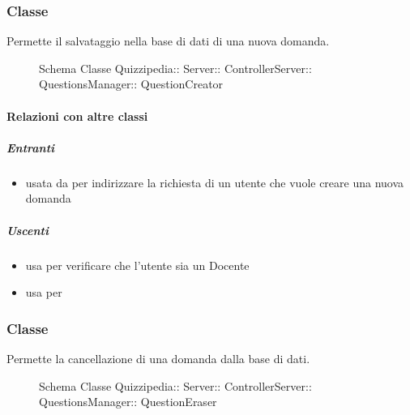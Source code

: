 \subsubsection{Classe }
Permette il salvataggio nella base di dati di una nuova domanda.
\begin{figure}[H]
\centering
\noindent{}
\caption[Schema Classe QuestionCreator]{Schema Classe Quizzipedia:: Server:: ControllerServer:: QuestionsManager:: QuestionCreator}
\end{figure}
\paragraph{Relazioni con altre classi}
\subparagraph{Entranti}
\begin{itemize}
\item usata da  per indirizzare la richiesta di un utente che vuole creare una nuova domanda
\end{itemize}
\subparagraph{Uscenti}
\begin{itemize}
\item usa  per verificare che l'utente sia un Docente
\item usa  per 
\end{itemize}
\subsubsection{Classe }
Permette la cancellazione di una domanda dalla base di dati.
\begin{figure}[H]
\centering
\noindent{}
\caption[Schema Classe QuestionEraser]{Schema Classe Quizzipedia:: Server:: ControllerServer:: QuestionsManager:: QuestionEraser}
\end{figure}
